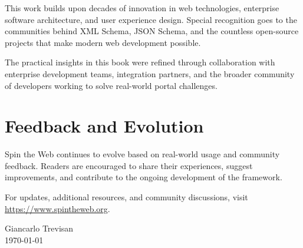 This work builds upon decades of innovation in web technologies, enterprise software architecture, and user experience design. Special recognition goes to the communities behind XML Schema, JSON Schema, and the countless open-source projects that make modern web development possible.

The practical insights in this book were refined through collaboration with enterprise development teams, integration partners, and the broader community of developers working to solve real-world portal challenges.

\section*{Feedback and Evolution}

Spin the Web continues to evolve based on real-world usage and community feedback. Readers are encouraged to share their experiences, suggest improvements, and contribute to the ongoing development of the framework.

For updates, additional resources, and community discussions, visit \url{https://www.spintheweb.org}.

\vspace{1cm}
\hfill Giancarlo Trevisan \\
\hfill \today

\clearpage
